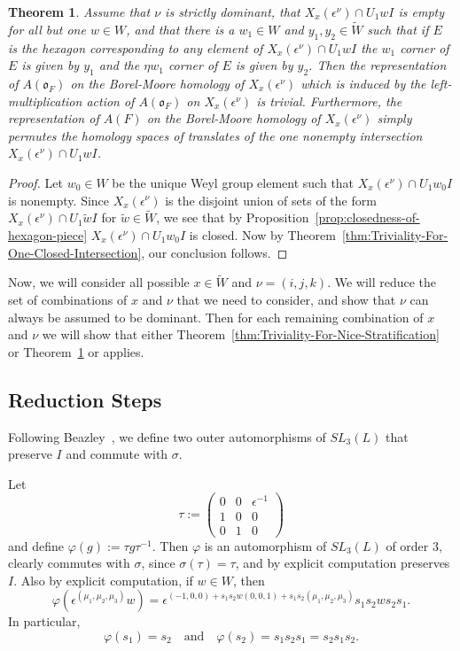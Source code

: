 \documentclass{amsart}
\newtheorem{theorem}{Theorem}
\theoremstyle{definition}
\def\O{\mathfrak{o}}
\def\e{\epsilon}
\def\W{\widetilde{W}}
\def\w{\widetilde{w}}
\def\s{\sigma}
\def\A{A(\O_F)}
\def\en{\e^{\nu}}
\def\X{X_x(\en)}
\def\phi{\varphi}
\begin{document}
  \begin{theorem}
    \label{thm:Triviality-For-One-Intersection}
    Assume that $\nu$ is strictly dominant, that $\X \cap U_1 wI$ is empty for
    all but one $w \in W$, and that there is a $w_1 \in W$ and $y_1, y_2 \in
    \W$ such that if $E$ is the hexagon corresponding to any element of $\X
    \cap U_1 wI$ the $w_1$ corner of $E$ is given by $y_1$ and the $\eta w_1$
    corner of $E$ is given by $y_2$.  Then the representation of $\A$ on the
    Borel-Moore homology of $\X$ which is induced by the left-multiplication
    action of $\A$ on $\X$ is trivial.  Furthermore, the representation of
    $A(F)$ on the Borel-Moore homology of $\X$ simply permutes the homology
    spaces of translates of the one nonempty intersection $\X \cap U_1 wI$.
  \end{theorem}
  \begin{proof}
    Let $w_0 \in W$ be the unique Weyl group element such that $\X \cap U_1 w_0
    I$ is nonempty.  Since $\X$ is the disjoint union of sets of the form $\X
    \cap U_1 \w I$ for $\w \in \W$, we see that by
    Proposition~\ref{prop:closedness-of-hexagon-piece} $\X \cap U_1 w_0 I$ is
    closed.  Now by Theorem~\ref{thm:Triviality-For-One-Closed-Intersection},
    our conclusion follows.
  \end{proof}

  Now, we will consider all possible $x \in \W$ and $\nu = (i, j, k)$.  We will
  reduce the set of combinations of $x$ and $\nu$ that we need to consider, and
  show that $\nu$ can always be assumed to be dominant.  Then for each
  remaining combination of $x$ and $\nu$ we will show that either
  Theorem~\ref{thm:Triviality-For-Nice-Stratification} or
  Theorem~\ref{thm:Triviality-For-One-Intersection} or applies.
  
  \subsection{Reduction Steps}
  \label{sec:Reduction-Steps}
  Following Beazley~\cite{Beazley-codimensions}, we define two outer
  automorphisms of $SL_3(L)$ that preserve $I$ and commute with $\s$.

  Let
  \begin{equation*}
    \tau :=
    \begin{pmatrix}
      0 & 0 & \e^{-1} \\
      1 & 0 & 0 \\
      0 & 1 & 0
    \end{pmatrix}
  \end{equation*}
  and define $\phi(g) := \tau g \tau^{-1}$.  Then $\phi$ is an automorphism of
  $SL_3(L)$ of order 3, clearly commutes with $\s$, since $\s(\tau) = \tau$,
  and by explicit computation preserves $I$.  Also by explicit computation, if
  $w \in W$, then
  \begin{equation*}
    \phi(\e^{(\mu_1,\mu_2,\mu_3)}w) = \e^{(-1, 0, 0) + s_1s_2w(0, 0, 1) +
    s_1s_2(\mu_1, \mu_2, \mu_3)}s_1s_2ws_2s_1.
  \end{equation*}
  In particular,
  \begin{equation*}
    \phi(s_1) = s_2 \quad \mbox{and} \quad \phi(s_2) = s_1s_2s_1 = s_2s_1s_2.
  \end{equation*}
\end{document}
